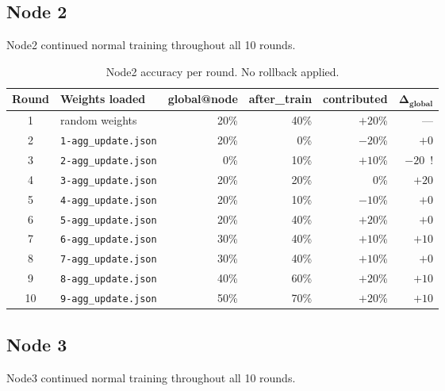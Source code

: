 \documentclass[11pt]{article}
\begin{document}
\subsection{Node 2}

Node2 continued normal training throughout all 10 rounds.

\begin{table}[H]
\centering
\begin{tabular}{clrrrr}
\toprule
\textbf{Round} & \textbf{Weights loaded} & \textbf{global@node} & \textbf{after\_train} & \textbf{contributed} & $\boldsymbol{\Delta_\text{global}}$ \\
\midrule
1  & random weights              & 20\% & 40\% & $+20$\% & ---       \\
2  & \texttt{1-agg\_update.json} & 20\% & 0\%  & $-20$\% & $+0$   \\
3  & \texttt{2-agg\_update.json} & 0\%  & 10\% & $+10$\% & $-20$~! \\
4  & \texttt{3-agg\_update.json} & 20\% & 20\% & $0$\%   & $+20$  \\
5  & \texttt{4-agg\_update.json} & 20\% & 10\% & $-10$\% & $+0$   \\
6  & \texttt{5-agg\_update.json} & 20\% & 40\% & $+20$\% & $+0$   \\
7  & \texttt{6-agg\_update.json} & 30\% & 40\% & $+10$\% & $+10$  \\
8  & \texttt{7-agg\_update.json} & 30\% & 40\% & $+10$\% & $+0$   \\
9  & \texttt{8-agg\_update.json} & 40\% & 60\% & $+20$\% & $+10$  \\
10 & \texttt{9-agg\_update.json} & 50\% & 70\% & $+20$\% & $+10$  \\
\bottomrule
\end{tabular}
\caption{Node2 accuracy per round. No rollback applied.}
\end{table}

\subsection{Node 3}

Node3 continued normal training throughout all 10 rounds.
\end{document}
